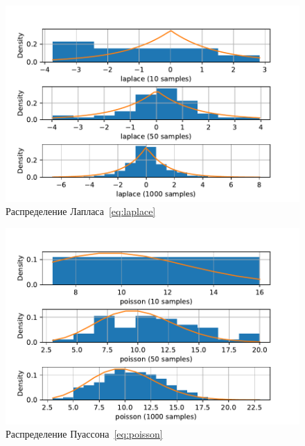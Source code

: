 \documentclass[a4paper]{article}
\begin{document}
        \begin{figure}[H]
            \centering
            \includegraphics[width = 16 cm]{src/laplace}
            \caption{Распределение Лапласа~\eqref{eq:laplace}}
            \label{fig:laplace}
        \end{figure}

        \begin{figure}[H]
            \centering
            \includegraphics[width = 16 cm]{src/poisson}
            \caption{Распределение Пуассона~\eqref{eq:poisson}}
            \label{fig:poisson}
        \end{figure}
\end{document}
